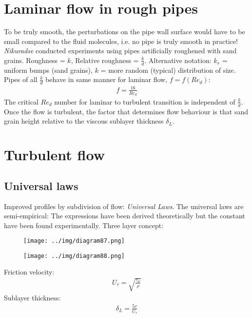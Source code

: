 \documentclass[class=report, crop=false, 12pt,a4paper]{standalone}
\begin{document}
\section{Laminar flow in rough pipes}
To be truly smooth, the perturbations on the pipe wall surface would have to be small compared to the fluid molecules, i.e. no pipe is truly smooth in practice! \textit{Nikuradse} conducted experiments using pipes artificially roughened with sand grains. Roughness = $k$, Relative roughness = $\frac{k}{d}$. Alternative notation: $k_s$ = uniform bumps (sand grains), $k$ = more random (typical) distribution of size. Pipes of all $\frac{k}{d}$ behave in same manner for laminar flow, $f = f\left(Re_d\right)$:
\begin{align}
  f = \frac{16}{Re_d}
\end{align}
The critical $Re_d$ number for laminar to turbulent transition is independent of $\frac{k}{d}$. Once the flow is turbulent, the factor that determines flow behaviour is that sand grain height relative to the viscous sublayer thickness $\delta_L$.
\section{Turbulent flow}
\subsection{Universal laws}
Improved profiles by subdivision of flow: \textit{Universal Laws}. The universal laws are semi-empirical: The expressions have been derived theoretically but the constant have been found experimentally. Three layer concept:
\begin{figure}[H]
  \centering
  \texttt{[image: ../img/diagram87.png]}
  \caption{}
\end{figure}
\begin{figure}[H]
  \centering
  \texttt{[image: ../img/diagram88.png]}
  \caption{}
\end{figure}
Friction velocity:
\begin{align}
  U_{\tau} = \sqrt{\frac{\tau_w}{\rho}}
\end{align}
Sublayer thickness:
\begin{align}
  \delta_L = \frac{5v}{U_{\tau}}
\end{align}
\end{document}
